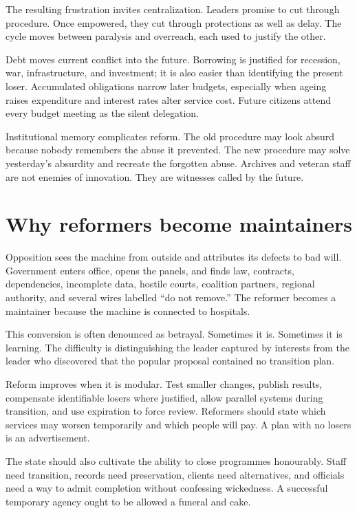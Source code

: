 \documentclass[12pt,a4paper]{book}
\begin{document}
The resulting frustration invites centralization.  Leaders promise to cut
through procedure.  Once empowered, they cut through protections as well as
delay.  The cycle moves between paralysis and overreach, each used to justify
the other.

Debt moves current conflict into the future.  Borrowing is justified for
recession, war, infrastructure, and investment; it is also easier than
identifying the present loser.  Accumulated obligations narrow later budgets,
especially when ageing raises expenditure and interest rates alter service
cost.  Future citizens attend every budget meeting as the silent delegation.

Institutional memory complicates reform.  The old procedure may look absurd
because nobody remembers the abuse it prevented.  The new procedure may solve
yesterday's absurdity and recreate the forgotten abuse.  Archives and veteran
staff are not enemies of innovation.  They are witnesses called by the future.

\section{Why reformers become maintainers}

Opposition sees the machine from outside and attributes its defects to bad
will.  Government enters office, opens the panels, and finds law, contracts,
dependencies, incomplete data, hostile courts, coalition partners, regional
authority, and several wires labelled ``do not remove.''  The reformer becomes
a maintainer because the machine is connected to hospitals.

This conversion is often denounced as betrayal.  Sometimes it is.  Sometimes
it is learning.  The difficulty is distinguishing the leader captured by
interests from the leader who discovered that the popular proposal contained
no transition plan.

Reform improves when it is modular.  Test smaller changes, publish results,
compensate identifiable losers where justified, allow parallel systems during
transition, and use expiration to force review.  Reformers should state which
services may worsen temporarily and which people will pay.  A plan with no
losers is an advertisement.

The state should also cultivate the ability to close programmes honourably.
Staff need transition, records need preservation, clients need alternatives,
and officials need a way to admit completion without confessing wickedness.
A successful temporary agency ought to be allowed a funeral and cake.
\end{document}

